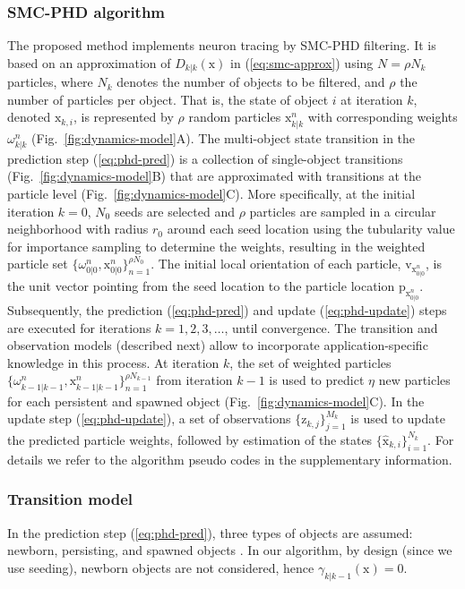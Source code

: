 \documentclass[noinfo,nocrop,final]{bioinfo}
\begin{document}
\subsubsection{SMC-PHD algorithm}
\label{ssec:smc-phd-rec}
The proposed method implements neuron tracing by SMC-PHD filtering. It is based on an approximation of $D_{k|k}(\mathrm{x})$ in (\ref{eq:smc-approx}) using $N=\rho N_k$ particles, where $N_k$ denotes the number of objects to be filtered, and $\rho$ the number of particles per object. That is, the state of object $i$ at iteration $k$, denoted $\mathrm{x}_{k,i}$, is represented by $\rho$ random particles $\mathrm{x}_{k|k}^{n}$ with corresponding weights $\omega_{k|k}^{n}$ (Fig.~\ref{fig:dynamics-model}A). The multi-object state transition in the prediction step (\ref{eq:phd-pred}) is a collection of single-object transitions (Fig.~\ref{fig:dynamics-model}B) that are approximated with transitions at the particle level (Fig.~\ref{fig:dynamics-model}C). More specifically, at the initial iteration $k=0$, $N_0$ seeds are selected and $\rho$ particles are sampled in a circular neighborhood with radius $r_0$ around each seed location using the tubularity value for importance sampling to determine the weights, resulting in the weighted particle set $\lbrace\omega_{0|0}^n,\mathrm{x}_{0|0}^n\rbrace_{n=1}^{\rho N_0}$. The initial local orientation of each particle, $\mathrm{v}_{\mathrm{x}_{0|0}^n}$, is the unit vector pointing from the seed location to the particle location $\mathrm{p}_{\mathrm{x}_{0|0}^n}$. Subsequently, the prediction (\ref{eq:phd-pred}) and update (\ref{eq:phd-update}) steps are executed for iterations $k=1,2,3,\dots$, until convergence. The transition and observation models (described next) allow to incorporate application-specific knowledge in this process. At iteration $k$, the set of weighted particles $\lbrace \omega_{k-1|k-1}^n, \mathrm{x}_{k-1|k-1}^n \rbrace_{n=1}^{\rho N_{k-1}}$ from iteration $k-1$ is used to predict $\eta$ new particles for each persistent and spawned object (Fig.~\ref{fig:dynamics-model}C). In the update step (\ref{eq:phd-update}), a set of observations $\lbrace \mathrm{z}_{k,j}\rbrace_{j=1}^{M_k}$ is used to update the predicted particle weights, followed by estimation of the states $\lbrace \hat{\mathrm{x}}_{k,i}\rbrace_{i=1}^{N_k}$. For details we refer to the algorithm pseudo codes in the supplementary information.

\subsubsection{Transition model}
\label{sssec:prediction-model}
In the prediction step (\ref{eq:phd-pred}), three types of objects are assumed: newborn, persisting, and spawned objects \citep{vo2005sequential,vo2006gaussian}. In our algorithm, by design (since we use seeding), newborn objects are not considered, hence $\gamma_{k|k-1}(\mathrm{x})=0$.
\end{document}
